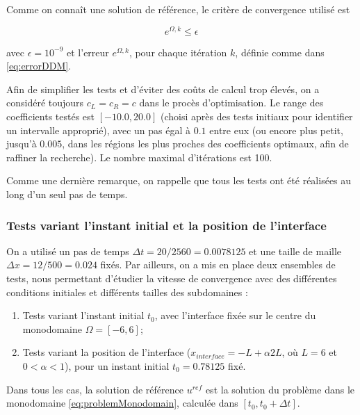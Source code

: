 \indent Comme on connaît une solution de référence, le critère de convergence utilisé est

\begin{equation*}
\label{eq:criteriaConvergence}
	e^{\Omega,k} \leq \epsilon
\end{equation*}

\noindent avec $\epsilon = 10^{-9}$ et  l'erreur $e^{\Omega,k}$, pour chaque itération $k$, définie comme dans \eqref{eq:errorDDM}.

\indent Afin de simplifier les tests et d'éviter des coûts de calcul trop élevés,  on a considéré toujours $c_L = c_R = c$  dans le procès d'optimisation. Le range des coefficients testés est $[-10.0, 20.0]$ (choisi après des tests initiaux pour identifier un intervalle approprié), avec un pas égal à  $0.1$ entre eux (ou encore plus petit, jusqu'à $0.005$, dans les régions les plus proches des coefficients optimaux, afin de raffiner la recherche). Le nombre maximal d'itérations est 100.

\indent Comme une dernière remarque, on rappelle que tous les tests ont été réalisées au long d'un seul pas de temps.

\subsubsection{Tests variant l'instant initial et la position de l'interface}

\indent On a utilisé un pas de temps $\Delta t = 20/2560 = 0.0078125$ et une taille de maille $\Delta x = 12/500 = 0.024$ fixés. Par ailleurs, on a mis en place deux ensembles de tests, nous permettant d'étudier la vitesse de convergence avec des différentes conditions initiales et différents tailles des subdomaines :

\begin{enumerate}
	\item Tests variant l'instant initial $t_0$, avec l'interface fixée sur le centre du monodomaine $\Omega = [-6,6]$;
	\item Tests variant la position de l'interface ($x_{interface} = -L + \alpha 2L$, où  $L = 6$ et $0 < \alpha < 1$), pour un instant initial $t_0 = 0.78125$ fixé.
\end{enumerate}

\indent Dans tous les cas, la solution de référence $u^{ref}$ est la solution du problème dans le monodomaine \eqref{eq:problemMonodomain}, calculée dans $[t_0,t_0 + \Delta t]$.

